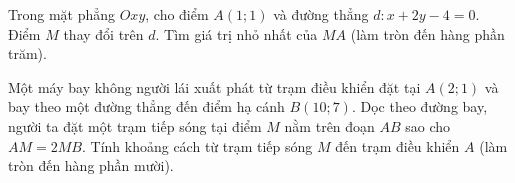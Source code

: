 \begin{bt}%
Trong mặt phẳng $Oxy$, cho điểm $A(1;1)$ và đường thẳng $d\colon x+2y-4=0$. Điểm $M$ thay đổi trên $d$. Tìm giá trị nhỏ nhất của $MA$ (làm tròn đến hàng phần trăm).

\end{bt}

\begin{bt}%
Một máy bay không người lái xuất phát từ trạm điều khiển đặt tại $A(2;1)$ và bay theo một đường thẳng đến điểm hạ cánh $B(10;7)$. Dọc theo đường bay, người ta đặt một trạm tiếp sóng tại điểm $M$ nằm trên đoạn $AB$ sao cho $AM=2MB$. Tính khoảng cách từ trạm tiếp sóng $M$ đến trạm điều khiển $A$ (làm tròn đến hàng phần mười).

\end{bt}


